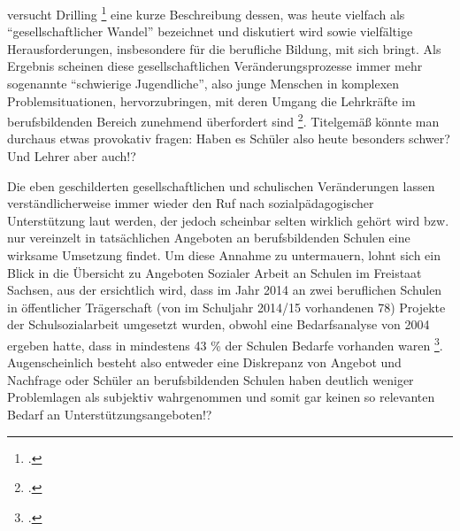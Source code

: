 \noindent
[\punkte] versucht Drilling \footcite[19]{Drilling2004} eine kurze Beschreibung dessen, was heute vielfach als "`gesellschaftlicher Wandel"' bezeichnet und diskutiert wird sowie vielfältige Herausforderungen, insbesondere für die berufliche Bildung, mit sich bringt. Als Ergebnis scheinen diese gesellschaftlichen Veränderungsprozesse immer mehr sogenannte "`schwierige Jugendliche"', also junge Menschen in komplexen Problemsituationen, hervorzubringen, mit deren Umgang die Lehrkräfte im berufsbildenden Bereich zunehmend überfordert sind \footcite[vgl.][1]{UniversitaetLeipzig2007}. Titelgemäß könnte man durchaus etwas provokativ fragen: Haben es Schüler also heute besonders schwer? Und Lehrer aber auch!? 

Die eben geschilderten gesellschaftlichen und schulischen Veränderungen lassen verständlicherweise immer wieder den Ruf nach sozialpädagogischer Unterstützung laut werden, der jedoch scheinbar selten wirklich gehört wird bzw. nur vereinzelt in tatsäch\-lichen Angeboten an berufsbildenden Schulen eine wirksame Umsetzung findet. Um diese Annahme zu untermauern, lohnt sich ein Blick in die Übersicht zu Angeboten Sozialer Arbeit an Schulen im Freistaat Sachsen, aus der ersichtlich wird, dass im Jahr 2014 an zwei beruflichen Schulen in öffentlicher Trägerschaft (von im Schuljahr 2014/15 vorhandenen 78) Projekte der Schulsozialarbeit umgesetzt wurden, obwohl eine Bedarfsanalyse von 2004 ergeben hatte, dass in mindestens 43 \% der Schulen Bedarfe vorhanden waren \footcites[vgl.][5]{LSS2004}[vgl.][5ff]{SMSSSV2014}. Augenscheinlich besteht also entweder eine Diskrepanz von Angebot und Nachfrage oder Schüler an berufsbildenden Schulen haben deutlich weniger Problemlagen als subjektiv wahrgenommen und somit gar keinen so relevanten Bedarf an Unterstützungsangeboten!?

